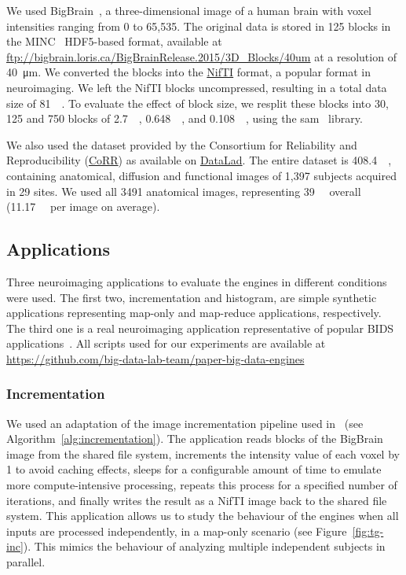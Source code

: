 \documentclass[conference]{IEEEtran}
\begin{document}
We used BigBrain~\cite{Amunts:13}, a three-dimensional image of a human
brain with voxel intensities ranging from 0 to 65,535. The original data is
stored in 125 blocks in the MINC~\cite{minc} HDF5-based format, available
at \url{ftp://bigbrain.loris.ca/BigBrainRelease.2015/3D\_Blocks/40um} at a
resolution of \SI{40}{\micro\metre}. We converted the blocks into the
\href{https://nifti.nimh.nih.gov/nifti-1}{NifTI} format, a popular format
in neuroimaging. We left the NifTI blocks uncompressed, resulting in 
a total data size of \SI{81}{\giga\byte}. 
To evaluate the effect of block size, we resplit these blocks into 30, 125 and 750 blocks of 
\SI{2.7}{\giga\byte}, \SI{0.648}{\giga\byte}, and
\SI{0.108}{\giga\byte}, using the sam~\cite{sam} library.

We also used the dataset provided by the Consortium for Reliability and
Reproducibility (\href{http://fcon_1000.projects.nitrc.org/indi/CoRR/html/}{CoRR}) as
available on \href{http://datasets.datalad.org/?dir=/corr/RawDataBIDS}{DataLad}. The
entire dataset is \SI{408.4}{\giga\byte}, containing anatomical, diffusion and
functional images of 1,397 subjects acquired in 29 sites. We used all 3491 anatomical
images, representing \SI{39}{\giga\byte} overall (\SI{11.17}{\mega\byte} per image on
average).


\subsection{Applications}

Three neuroimaging applications to evaluate the engines in different
conditions were used. The first two, incrementation and histogram, are simple 
synthetic applications representing map-only and map-reduce applications,
respectively. The third one is a real neuroimaging application representative
of popular BIDS applications~\cite{gorgolewski2017bids}. All scripts used for our
experiments are available at
\url{https://github.com/big-data-lab-team/paper-big-data-engines}

\subsubsection{Incrementation}
We used an adaptation of the image incrementation pipeline used
in~\cite{hayot2019performance} (see Algorithm~\ref{alg:incrementation}).
The application reads blocks of the BigBrain image from the shared file
system, increments the intensity value of each voxel by 1 to avoid caching
effects, sleeps for a configurable amount of time to emulate more
compute-intensive processing, repeats this process for a specified number of
iterations, and
finally writes the result as a NifTI image back to the shared file system.
This application allows us to study the behaviour of the engines when all
inputs are processed independently, in a map-only scenario (see
Figure~\ref{fig:tg-inc}). This mimics the behaviour of analyzing multiple
independent subjects in parallel.
\end{document}
